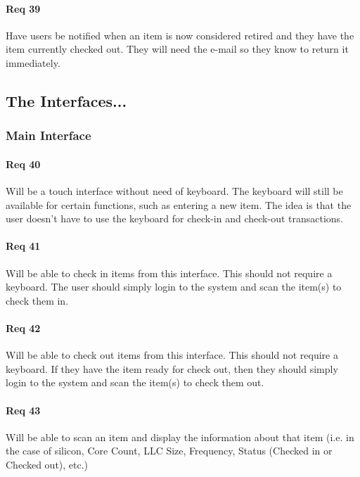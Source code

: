 \documentclass[10pt, onecolumn, twoside, peerreview]{IEEEtran}
\begin{document}
\paragraph*{Req 39} Have users be notified when an item is now considered retired and they have the item currently checked out. They will
need the e-mail so they know to return it immediately.\\

\subsection{The Interfaces...}
\subsubsection{Main Interface}
\paragraph*{Req 40} Will be a touch interface without need of keyboard. The keyboard will still be available for certain functions, such as
entering a new item. The idea is that the user doesn’t have to use the keyboard for check-in and check-out
transactions.\\

\paragraph*{Req 41} Will be able to check in items from this interface. This should not require a keyboard. The user should simply login to
the system and scan the item(s) to check them in.\\

\paragraph*{Req 42} Will be able to check out items from this interface. This should not require a keyboard. If they have the item ready
for check out, then they should simply login to the system and scan the item(s) to check them out.\\

\paragraph*{Req 43} Will be able to scan an item and display the information about that item (i.e. in the case of silicon, Core Count, LLC
Size, Frequency, Status (Checked in or Checked out), etc.)\\
\end{document}
